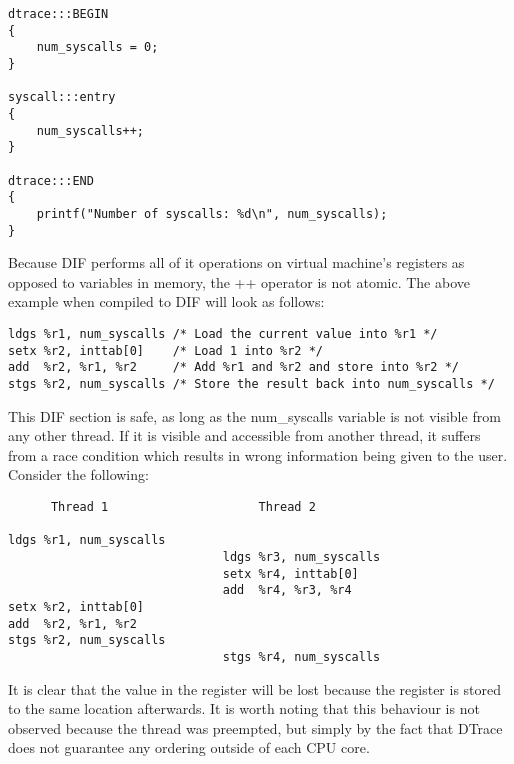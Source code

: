 \begin{verbatim}
dtrace:::BEGIN
{
    num_syscalls = 0;
}

syscall:::entry
{
    num_syscalls++;
}

dtrace:::END
{
    printf("Number of syscalls: %d\n", num_syscalls);
}
\end{verbatim}

\noindent
Because DIF performs all of it operations on virtual machine's registers as opposed
to variables in memory, the ++ operator is not atomic. The above example when compiled
to DIF will look as follows:

\begin{verbatim}
ldgs %r1, num_syscalls /* Load the current value into %r1 */
setx %r2, inttab[0]    /* Load 1 into %r2 */
add  %r2, %r1, %r2     /* Add %r1 and %r2 and store into %r2 */
stgs %r2, num_syscalls /* Store the result back into num_syscalls */
\end{verbatim}

\noindent
This DIF section is safe, as long as the num\_syscalls variable is not visible from any
other thread. If it is visible and accessible from another thread, it suffers from a race
condition which results in wrong information being given to the user. Consider the following:

\begin{verbatim}
      Thread 1                     Thread 2

ldgs %r1, num_syscalls
                              ldgs %r3, num_syscalls
                              setx %r4, inttab[0]
                              add  %r4, %r3, %r4
setx %r2, inttab[0]
add  %r2, %r1, %r2
stgs %r2, num_syscalls
                              stgs %r4, num_syscalls
\end{verbatim}

\noindent
It is clear that the value in the  register will be lost because the register
 is stored to the same location afterwards. It is worth noting that this
behaviour is not observed because the thread was preempted, but simply by the fact that DTrace
does not guarantee any ordering outside of each CPU core.